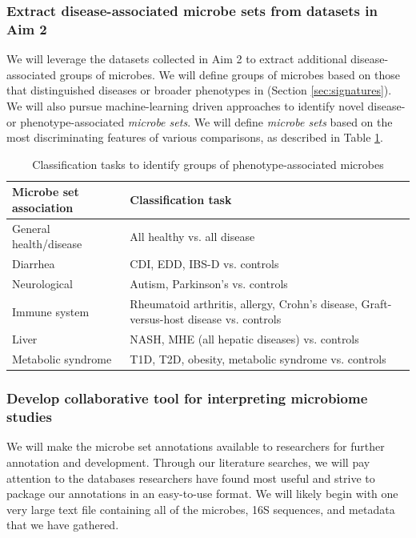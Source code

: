 \documentclass[12pt]{article}
\begin{document}
\subsubsection{Extract disease-associated microbe sets from datasets in Aim 2}
We will leverage the datasets collected in Aim 2 to extract additional disease-associated groups of microbes. We will define groups of microbes based on those that distinguished diseases or broader phenotypes in (Section \ref{sec:signatures}). We will also pursue machine-learning driven approaches to identify novel disease- or phenotype-associated \textit{microbe sets}. We will define \textit{microbe sets} based on the most discriminating features of various comparisons, as described in Table \ref{tab:classifications}.

\begin{table}
\begin{center}
\begin{tabular}{|p{6cm}|p{10cm}|}
	\hline
	\textbf{Microbe set association} & \textbf{Classification task} \\
	\hline
	General health/disease & All healthy vs. all disease \\
	\hline
	Diarrhea & CDI, EDD, IBS-D vs. controls \\
	\hline
	Neurological & Autism, Parkinson's vs. controls \\
	\hline
	Immune system & Rheumatoid arthritis, allergy, Crohn's disease, Graft-versus-host disease vs. controls \\
	\hline
	Liver & NASH, MHE (all hepatic diseases) vs. controls\\
	\hline
	Metabolic syndrome & T1D, T2D, obesity, metabolic syndrome vs. controls \\
	\hline
\end{tabular}
\caption{Classification tasks to identify groups of phenotype-associated microbes}\label{tab:classifications}
\end{center}
\end{table}

\subsubsection{Develop collaborative tool for interpreting microbiome studies}
We will make the microbe set annotations available to researchers for further annotation and development. Through our literature searches, we will pay attention to the databases researchers have found most useful and strive to package our annotations in an easy-to-use format. We will likely begin with one very large text file containing all of the microbes, 16S sequences, and metadata that we have gathered. 
\end{document}
